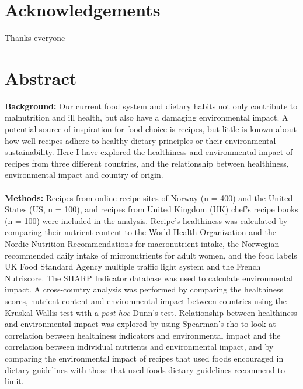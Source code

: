 \let\maketitle\oldmaketitle

\pagestyle{plain}

\chapter*{Acknowledgements}
Thanks everyone
\pagebreak

\chapter*{Abstract}
\textbf{Background:} Our current food system and dietary habits not only contribute to malnutrition and ill health, but also have a damaging environmental impact. A potential source of inspiration for food choice is recipes, but little is known about how well recipes adhere to healthy dietary principles or their environmental sustainability. Here I have explored the healthiness and environmental impact of recipes from three different countries, and the relationship between healthiness, environmental impact and country of origin.\\\\
\textbf{Methods:} Recipes from online recipe sites of Norway (n = 400) and the United States (US, n = 100), and recipes from United Kingdom (UK) chef's recipe books (n = 100) were included in the analysis. Recipe's healthiness was calculated by comparing their nutrient content to the World Health Organization and the Nordic Nutrition Recommendations for macronutrient intake, the Norwegian recommended daily intake of micronutrients for adult women, and the food labels UK Food Standard Agency multiple traffic light system and the French Nutriscore. The SHARP Indicator database was used to calculate environmental impact. A cross-country analysis was performed by comparing the healthiness scores, nutrient content and environmental impact between countries using the Kruskal Wallis test with a \emph{post-hoc} Dunn's test. Relationship between healthiness and environmental impact was explored by using Spearman's rho to look at correlation between healthiness indicators and environmental impact and the correlation between individual nutrients and environmental impact, and by comparing the environmental impact of recipes that used foods encouraged in dietary guidelines with those that used foods dietary guidelines recommend to limit.\\\\\\
